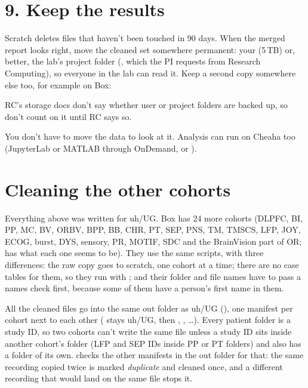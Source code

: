 \section{9. Keep the results}
Scratch deletes files that haven't been touched in 90 days. When the merged report looks right, move the cleaned set somewhere permanent: your  (5\,TB) or, better, the lab's project folder (, which the PI requests from Research Computing), so everyone in the lab can read it. Keep a second copy somewhere else too, for example on Box:
RC's storage docs don't say whether user or project folders are backed up, so don't count on it until RC says so.

You don't have to move the data to look at it. Analysis can run on Cheaha too (JupyterLab or MATLAB through OnDemand, or ).

\section{Cleaning the other cohorts}
Everything above was written for uh/UG. Box has 24 more cohorts (DLPFC, BI, PP, MC, BV, ORBV, BPP, BB, CHR, PT, SEP, PNS, TM, TMSCS, LFP, JOY, ECOG, burst, DYS, sensory, PR, MOTIF, SDC and the BrainVision part of OR;  has what each one seems to be). They use the same scripts, with three differences: the raw copy goes to scratch, one cohort at a time; there are no case tables for them, so they run with ; and their folder and file names have to pass a names check first, because some of them have a person's first name in them.

All the cleaned files go into the same out folder as uh/UG (), one manifest per cohort next to each other ( stays uh/UG, then , , \ldots). Every patient folder is a study ID, so two cohorts can't write the same file unless a study ID sits inside another cohort's folder (LFP and SEP IDs inside PP or PT folders) and also has a folder of its own.  checks the other manifests in the out folder for that: the same recording copied twice is marked \textit{duplicate} and cleaned once, and a different recording that would land on the same file stops it.

